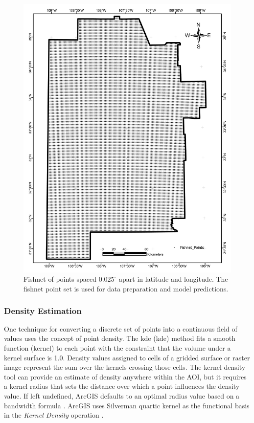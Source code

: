 \begin{figure}
\centering
\includegraphics[width=0.75\linewidth]{templates/images/Figure-Fishnet.pdf}
\caption[Fishnet point set]{Fishnet of points spaced $0.025^\circ$ apart in latitude and longitude. The fishnet point set is used for data preparation and model predictions.} 
\label{fig:fishnet}
\end{figure}

\subsubsection{Density Estimation}\label{ch3:density_est}
One technique for converting a discrete set of points into a continuous field of values uses the concept of point density. The \acrlong{kde} (\acrshort{kde}) method fits a smooth function (kernel) to each point with the constraint that the volume under a kernel surface is 1.0. Density values assigned to cells of a gridded surface or raster image represent the sum over the kernels crossing those cells. The kernel density tool can provide an estimate of density anywhere within the AOI, but it requires a kernel radius that sets the distance over which a point influences the density value. If left undefined, ArcGIS defaults to an optimal radius value based on a bandwidth formula \citep{esri_kernel_2021}. ArcGIS uses Silverman quartic kernel as the functional basis in the \textit{Kernel Density} operation \citep{esri_kernel_2021,silverman_density_1986}.

